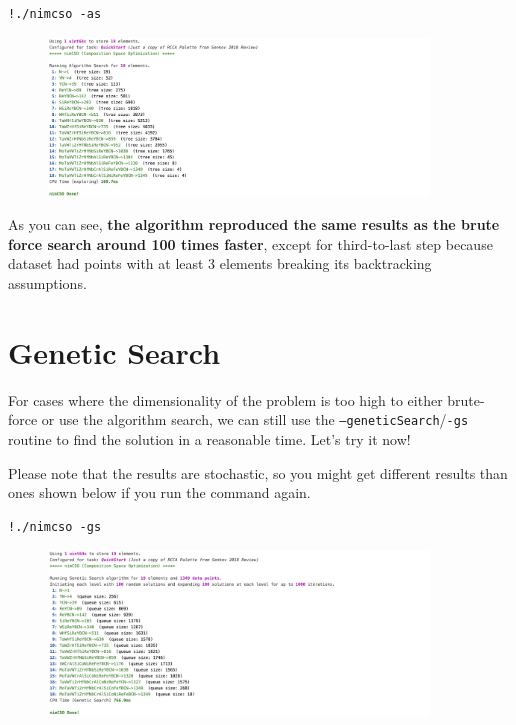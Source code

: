 \begin{verbatim}
!./nimcso -as
\end{verbatim}

\begin{figure}[H]
  \centering
  \includegraphics[width=0.9\textwidth]{nimcsotutorial/7.png}
\end{figure}

As you can see, \textbf{the algorithm reproduced the same results as the
brute force search around 100 times faster}, except for third-to-last
step because dataset had points with at least 3 elements breaking its
backtracking assumptions.

\hypertarget{genetic-search}{%
\section{Genetic Search}\label{nimcsotutorial:genetic-search}}

For cases where the dimensionality of the problem is too high to either
brute-force or use the algorithm search, we can still use the
\texttt{--geneticSearch}/\texttt{-gs}
routine to find the solution in a reasonable time. Let's try it now!

Please note that the results are stochastic, so you might get different
results than ones shown below if you run the command again.

\begin{verbatim}
!./nimcso -gs
\end{verbatim}

\begin{figure}[H]
  \centering
  \includegraphics[width=0.9\textwidth]{nimcsotutorial/8.png}
\end{figure}

